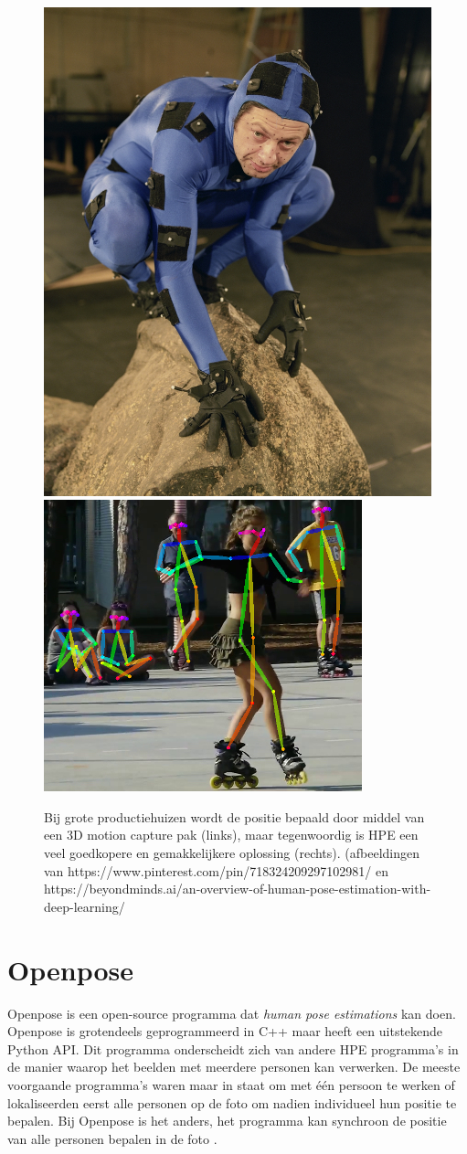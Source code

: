 \documentclass[a4paper,twoside,kulak]{kulakreport}
\begin{document}
	\begin{figure}[H]
		\includegraphics[width=.4\textwidth]{3D_motion_capture}
		\includegraphics[width=.55\textwidth]{HPE_voorbeeld}
		\caption{Bij grote productiehuizen wordt de positie bepaald door middel van een 3D motion capture pak (links), maar tegenwoordig is HPE een veel goedkopere en gemakkelijkere oplossing (rechts).
		(afbeeldingen van https://www.pinterest.com/pin/718324209297102981/ en https://beyondminds.ai/an-overview-of-human-pose-estimation-with-deep-learning/}
		\label{3D_pak}
	\end{figure}

\section{Openpose}
Openpose is een open-source programma dat \emph{human pose estimations} kan doen. Openpose is grotendeels geprogrammeerd in C++ maar heeft een uitstekende Python API. Dit programma onderscheidt zich van andere HPE programma's in de manier waarop het beelden met meerdere personen kan verwerken. De meeste voorgaande programma's waren maar in staat om met één persoon te werken of lokaliseerden eerst alle personen op de foto om nadien individueel hun positie te bepalen. Bij Openpose is het anders, het programma kan synchroon de positie van alle personen bepalen in de foto \cite{openpose}.
\end{document}
